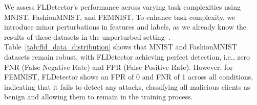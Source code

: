 We assess FLDetector's performance across varying task complexities using MNIST, FashionMNIST, and FEMNIST. To enhance task complexity, we introduce minor perturbations in features and labels, as we already know the results of these datasets in the unperturbed setting~\cite{zhang2022fldetector}. Table~\ref{tab:fld_data_distribution} shows that MNIST and FashionMNIST datasets remain robust, with FLDetector achieving perfect detection, i.e., zero FNR (False Negative Rate) and FPR (False Positive Rate). However, for FEMNIST, FLDetector shows an FPR of 0 and FNR of 1 across all conditions, indicating that it fails to detect any attacks, classifying all malicious clients as benign and allowing them to remain in the training process.

